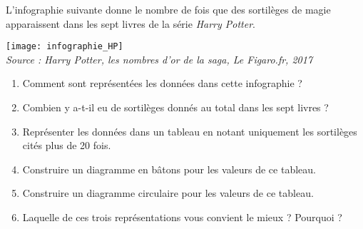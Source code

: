 \begin{colonne*exercice}
\bigskip

\begin{exercice} %
   L'infographie suivante donne le nombre de fois que des sortilèges de magie apparaissent dans les sept livres de la série {\it Harry Potter}.
   \begin{center}
      \texttt{[image: infographie\_HP]} \\
      \hfill {\footnotesize\it Source : Harry Potter, les nombres d'or de la saga, Le Figaro.fr, 2017}
   \end{center}
   \begin{enumerate}
      \item Comment sont représentées les données dans cette infographie ?
      \item Combien y a-t-il eu de sortilèges donnés au total dans les sept livres ?
      \item Représenter les données dans un tableau en notant uniquement les sortilèges cités plus de 20 fois.
      \item Construire un diagramme en bâtons pour les valeurs de ce tableau.
      \item Construire un diagramme circulaire pour les valeurs de ce tableau.
      \item Laquelle de ces trois représentations vous convient le mieux ? Pourquoi ?
   \end{enumerate}
\end{exercice}


\end{colonne*exercice}
